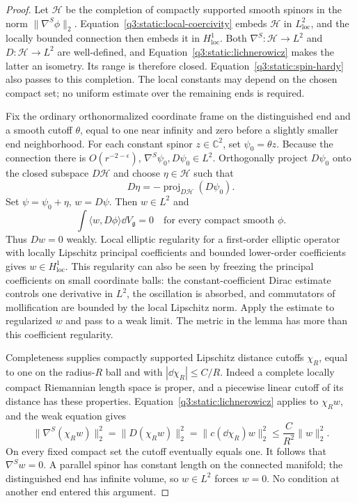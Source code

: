 \begin{proof}
Let \(\mathcal H\) be the completion of compactly supported smooth
spinors in the norm \(\|\nabla^S\phi\|_2\).
Equation~\eqref{q3:static:local-coercivity} embeds \(\mathcal H\)
in \(L^2_{\mathrm{loc}}\), and the locally bounded connection
then embeds it in \(H^1_{\mathrm{loc}}\).
Both \(\nabla^S:\mathcal H\to L^2\) and
\(D:\mathcal H\to L^2\) are well-defined, and
Equation~\eqref{q3:static:lichnerowicz} makes the latter an isometry.
Its range is therefore closed.
Equation~\eqref{q3:static:spin-hardy} also passes to this completion.
The local constants may depend on the chosen compact set; no uniform
estimate over the remaining ends is required.

Fix the ordinary orthonormalized coordinate frame on the distinguished
end and a smooth cutoff \(\theta\), equal to one near infinity and
zero before a slightly smaller end neighborhood.
For each constant spinor \(z\in\mathbb C^2\), set
\(\psi_0=\theta z\).
Because the connection there is \(O(r^{-2-\epsilon})\),
\(\nabla^S\psi_0,D\psi_0\in L^2\).
Orthogonally project \(D\psi_0\) onto the closed subspace
\(D\mathcal H\) and choose \(\eta\in\mathcal H\) such that
\[
D\eta=-\operatorname{proj}_{D\mathcal H}(D\psi_0).
\]
Set \(\psi=\psi_0+\eta\), \(w=D\psi\).
Then \(w\in L^2\) and
\[
\int\langle w,D\phi\rangle\dd V_{\mathfrak g}=0
\quad\text{for every compact smooth }\phi.
\]
Thus \(Dw=0\) weakly.
Local elliptic regularity for a first-order elliptic operator with
locally Lipschitz principal coefficients and bounded lower-order
coefficients gives \(w\in H^1_{\mathrm{loc}}\).
This regularity can also be seen by freezing the principal
coefficients on small coordinate balls: the constant-coefficient
Dirac estimate controls one derivative in \(L^2\), the oscillation
is absorbed, and commutators of mollification are bounded by the
local Lipschitz norm. Apply the estimate to regularized \(w\)
and pass to a weak limit.
The metric in the lemma has more than this coefficient regularity.

Completeness supplies compactly supported Lipschitz distance cutoffs
\(\chi_R\), equal to one on the radius-\(R\) ball and with
\(|\dd\chi_R|\leq C/R\).
Indeed a complete locally compact Riemannian length space is proper,
and a piecewise linear cutoff of its distance has these properties.
Equation~\eqref{q3:static:lichnerowicz} applies to \(\chi_Rw\), and
the weak equation gives
\[
\|\nabla^S(\chi_Rw)\|_2^2
=\|D(\chi_Rw)\|_2^2
=\|c(\dd\chi_R)w\|_2^2
\leq \frac C{R^2}\|w\|_2^2.
\]
On every fixed compact set the cutoff eventually equals one.
It follows that \(\nabla^S w=0\).
A parallel spinor has constant length on the connected manifold;
the distinguished end has infinite volume, so \(w\in L^2\)
forces \(w=0\).
No condition at another end entered this argument.


\end{proof}
